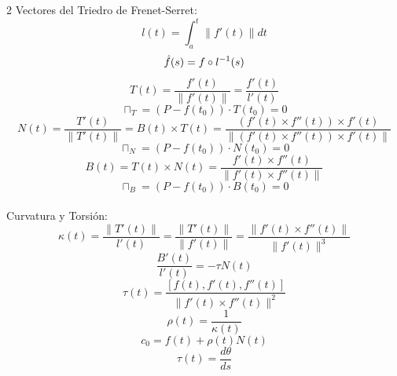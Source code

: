 \documentclass{article}
\begin{document}
\begin{multicols}{2}
Vectores del Triedro de Frenet-Serret:
   $$ l(t) = \int_a^t \| f'(t) \| dt$$
   $$ \Hat{f}(s) = f \circ l^{-1}(s) $$
   $$T(t) = \frac{f'(t)}{\|f'(t)\|} = \frac{f'(t)}{l'(t)}$$
   $$ \sqcap_T = (P - f(t_0)) \cdot T(t_0) = 0 $$
   $$N(t) = \frac{T'(t)}{\|T'(t)\|} = B(t) \times T(t) = \frac{(f'(t) \times f''(t)) \times f'(t)}{\| (f'(t) \times f''(t)) \times f'(t) \|}$$
   $$ \sqcap_N = (P - f(t_0)) \cdot N(t_0) = 0 $$
   $$B(t) = T(t) \times N(t) = \frac{f'(t) \times f''(t)}{\| f'(t) \times f''(t) \|}$$
   $$ \sqcap_B = (P - f(t_0)) \cdot B(t_0) = 0 $$
   \\
Curvatura y Torsión:
   $$\kappa(t) = \frac{\|T'(t)\|}{l'(t)} = \frac{\|T'(t)\|}{\|f'(t)\|} = \frac{\| f'(t) \times f''(t) \|}{\| f'(t) \|^3}$$
   $$ \frac{B'(t)}{l'(t)} = -\tau N(t) $$
   $$\tau(t) = \frac{[f(t),f'(t),f''(t)]}{\| f'(t) \times f''(t) \|^2}$$
   $$\rho(t) = \frac{1}{\kappa(t)}$$
   $$ c_0 = f(t) + \rho(t) N (t)$$
   $$\tau(t) = \frac{d\theta}{ds}$$
\end{multicols}
\end{document}
